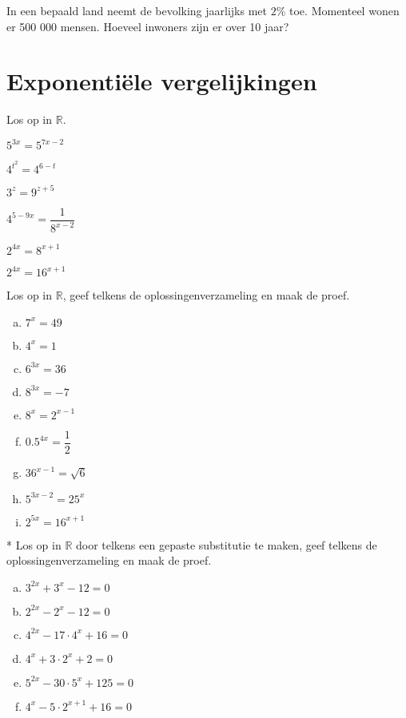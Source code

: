 \documentclass[12pt,twoside]{article}
\begin{document}
\begin{oefening}
In een bepaald land neemt de bevolking jaarlijks met $2\%$ toe. Momenteel wonen er 500 000 mensen. Hoeveel inwoners zijn er over 10 jaar?
\end{oefening}

\pagebreak
\section{Exponentiële vergelijkingen}

\begin{oefening}
Los op in $\mathbb{R}$.
\begin{exlist}{2}
  \item $5^{3x}=5^{7x-2}$
  \item $4^{t^2}=4^{6-t}$
  \item $3^z=9^{z+5}$
  \item $4^{5-9x}=\dfrac{1}{8^{x-2}}$
  \item $2^{4x}=8^{x+1}$
  \item $2^{4x}=16^{x+1}$
\end{exlist}
\end{oefening}


\begin{oefening}
Los op in $\mathbb{R}$, geef telkens de oplossingenverzameling en maak de proef.
\begin{multicols}{3}
\begin{enumerate}[(a)]
  \item $7^x=49$
  \item $4^x=1$
  \item $6^{3x}=36$
  \item $8^{3x}=-7$
  \item $8^x=2^{x-1}$
  \item $0.5^{4x}=\dfrac{1}{2}$
  \item $36^{x-1}=\sqrt{6}$
  \item $5^{3x-2}=25^x$
  \item $2^{5x}=16^{x+1}$
\end{enumerate}
\end{multicols}
\end{oefening}

\begin{oefening}*
Los op in $\mathbb{R}$ door telkens een gepaste substitutie te maken, geef telkens de oplossingenverzameling en maak de proef.
\begin{multicols}{3}
\begin{enumerate}[(a)]
  \item $3^{2x}+3^x-12=0$
  \item $2^{2x}-2^x-12=0$
  \item $4^{2x}-17\cdot 4^x + 16=0$
  \item $4^x+3\cdot 2^x+2=0$
  \item $5^{2x}-30\cdot 5^x+125=0$
  \item $4^x-5\cdot 2^{x+1}+16=0$
\end{enumerate}
\end{multicols}
\end{oefening}
\end{document}
